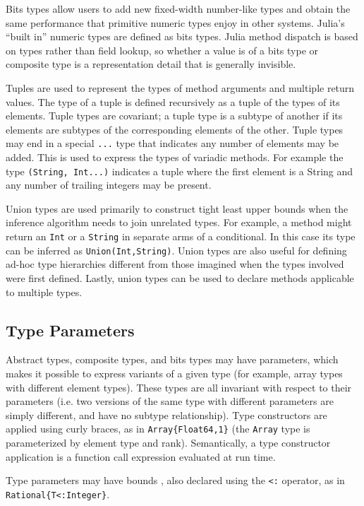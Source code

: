 \documentclass[9pt]{sigplanconf}
\begin{document}
Bits types allow users to add new fixed-width number-like types and obtain the
same performance that primitive numeric types enjoy in other systems. Julia's
``built in'' numeric types are defined as bits types. Julia method dispatch
is based on types rather than field lookup, so whether a value is of a bits
type or composite type is a representation detail that is generally
invisible.

Tuples are used to represent the types of method arguments and multiple
return values. The type of a tuple is
defined recursively as a tuple of the types of its elements. Tuple types are
covariant; a tuple type is a subtype of another if
its elements are subtypes of the corresponding elements of the other.
Tuple types may end in a special {\tt ...} type that
indicates any number of elements may be added. This is used to express the
types of variadic methods. For example the type {\tt (String, Int...)}
indicates a tuple where the first element is a String and any number of
trailing integers may be present.

Union types are used primarily to construct tight least upper bounds
when the inference algorithm needs to join unrelated types. For example,
a method might return an {\tt Int} or a {\tt String} in separate
arms of a conditional. In this case its type can be inferred as
{\tt Union(Int,String)}. Union types are also useful for defining
ad-hoc type hierarchies different from those imagined when the types
involved were first defined. Lastly,
union types can be used to declare methods applicable to multiple types.


\subsection{Type Parameters}

Abstract types, composite types, and bits types may have parameters, which
makes it possible to express variants of a given type (for example, array types
with different element types). These types are all invariant with respect to
their parameters (i.e. two versions of the same type with different parameters
are simply different, and have no subtype relationship). Type
constructors are applied using curly braces, as in {\tt Array\{Float64,1\}}
(the {\tt Array} type is parameterized by element type and rank).
Semantically, a type constructor application is a function call expression
evaluated at run time.

Type parameters may have bounds \cite{boundedquant}, also declared using
the {\tt <:} operator, as in {\tt Rational\{T<:Integer\}}.
\end{document}
